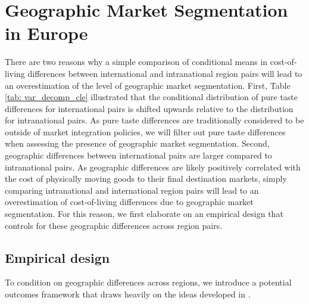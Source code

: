 \section{Geographic Market Segmentation in Europe}\label{sec:border_effects_eu}
There are two reasons why a simple comparison of conditional means in cost-of-living differences between international and intranational region pairs will lead to an overestimation of the level of geographic market segmentation. First, Table \ref{tab: var_decomp_cle} illustrated that the conditional distribution of pure taste differences for international pairs is shifted upwards relative to the distribution for intranational pairs. As pure taste differences are traditionally considered to be outside of market integration policies, we will filter out pure taste differences when assessing the presence of geographic market segmentation. Second, geographic differences between international pairs are larger compared to intranational pairs. As geographic differences are likely positively correlated with the cost of physically moving goods to their final destination markets, simply comparing intranational and international region pairs will lead to an overestimation of cost-of-living differences due to geographic market segmentation. For this reason, we first elaborate on an empirical design that controls for these geographic differences across region pairs. 

\subsection{Empirical design}
To condition on geographic differences across regions, we introduce a potential outcomes framework that draws heavily on the ideas developed in \citet{Santamaria2021}. 
